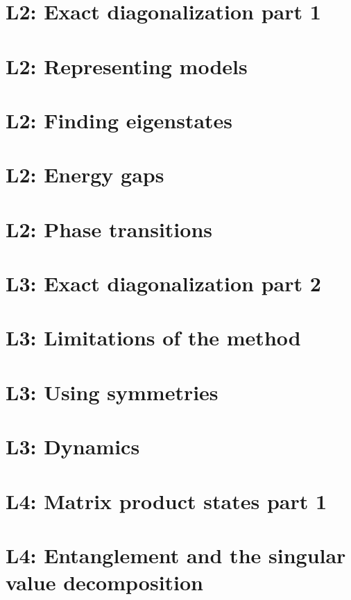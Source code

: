 \documentclass{book}
\theoremstyle{definition}
\begin{document}
\newpage

\section{L2: Exact diagonalization part 1}

\section{L2: Representing models}

\section{L2: Finding eigenstates}

\section{L2: Energy gaps}

\section{L2: Phase transitions}
\newpage




\section{L3: Exact diagonalization part 2}


\section{L3: Limitations of the method}

\section{L3: Using symmetries}

\section{L3: Dynamics}


\newpage


\section{L4: Matrix product states part 1}




\section{L4: Entanglement and the singular value decomposition}
\end{document}
